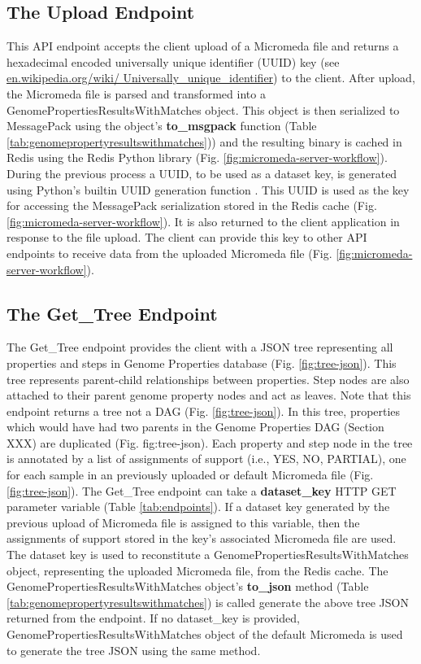 \subsection{The Upload Endpoint} \label{endpoint-upload}

This API endpoint accepts the client upload of a Micromeda file and returns a hexadecimal encoded universally unique identifier (UUID) key \cite{leach2005universally} (see \href{en.wikipedia.org/wiki/Universally\_unique\_identifier}{en.wikipedia.org/wiki/ Universally\_unique\_identifier}) to the client. After upload, the Micromeda file is parsed and transformed into a GenomePropertiesResultsWithMatches object. This object is then serialized to MessagePack using the object's \textbf{to\_msgpack} function (Table \ref{tab:genomepropertyresultswithmatches})) and the resulting binary is cached in Redis using the Redis Python library \cite{mccurdy_2019} (Fig. \ref{fig:micromeda-server-workflow}). During the previous process a UUID, to be used as a dataset key, is generated using Python's builtin UUID generation function \cite{PythonUUID}. This UUID is used as the key for accessing the MessagePack serialization stored in the Redis cache (Fig. \ref{fig:micromeda-server-workflow}). It is also returned to the client application in response to the file upload. The client can provide this key to other API endpoints to receive data from the uploaded Micromeda file (Fig. \ref{fig:micromeda-server-workflow}). 

\subsection{The Get\_Tree Endpoint}

The Get\_Tree endpoint provides the client with a JSON tree representing all properties and steps in Genome Properties database (Fig. \ref{fig:tree-json}). This tree represents parent-child relationships between properties. Step nodes are also attached to their parent genome property nodes and act as leaves. Note that this endpoint returns a tree not a DAG (Fig. \ref{fig:tree-json}). In this tree, properties which would have had two parents in the Genome Properties DAG (Section XXX) are duplicated (Fig. fig:tree-json). Each property and step node in the tree is annotated by a list of assignments of support (i.e., YES, NO, PARTIAL), one for each sample in an previously uploaded or default Micromeda file (Fig. \ref{fig:tree-json}). The Get\_Tree endpoint can take a \textbf{dataset\_key} HTTP GET parameter variable (Table \ref{tab:endpoints}). If a dataset key generated by the previous upload of Micromeda file is assigned to this variable, then the assignments of support stored in the key's associated Micromeda file are used. The dataset key is used to reconstitute a GenomePropertiesResultsWithMatches object, representing the uploaded Micromeda file, from the Redis cache. The GenomePropertiesResultsWithMatches object's \textbf{to\_json} method (Table \ref{tab:genomepropertyresultswithmatches}) is called generate the above tree JSON returned from the endpoint. If no dataset\_key is provided, GenomePropertiesResultsWithMatches object of the default Micromeda is used to generate the tree JSON using the same method.


